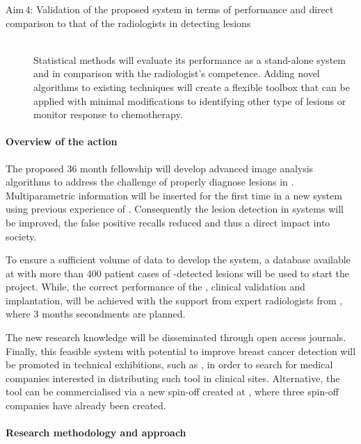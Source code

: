 \begin{description}
  \item [Aim\,4: Validation of the proposed system in terms of performance and direct comparison
to that of the radiologists in detecting lesions]
  \hfill \\

  Statistical methods will evaluate its performance as a stand-alone system and
  in comparison with the radiologist’s competence. Adding novel algorithms to
  existing techniques will create a flexible toolbox that can be applied with
  minimal modifications to identifying other type of lesions or monitor
  response to chemotherapy.

\end{description}

\paragraph{Overview of the action}

The proposed 36 month fellowship will develop advanced image analysis algorithms to address the challenge of properly diagnose \nmle lesions in \mri.
Multiparametric \mri information will be inserted for the first time in a new \cad system using previous experience of \vicorob. Consequently the lesion detection in \cad systems will be improved, the false positive recalls reduced and thus a direct impact into society.

To ensure a sufficient volume of data to develop the \cad system, a database available at \florida with more than 400 patient cases of \mri-detected \nmle lesions will be used to start the project. While, the correct performance of the \cad, clinical validation and implantation, will be achieved with the support from expert radiologists from \udiat, where 3 months secondments are planned.

The new research knowledge will be disseminated through open access journals. Finally, this feasible \cad system with potential to improve breast cancer detection will be promoted in technical exhibitions, such as \ecr, in order to search for medical companies interested in distributing such tool in clinical sites. Alternative, the tool can be commercialised via a new spin-off created at \vicorob, where three spin-off companies have already been created.

\paragraph{Research methodology and approach}
